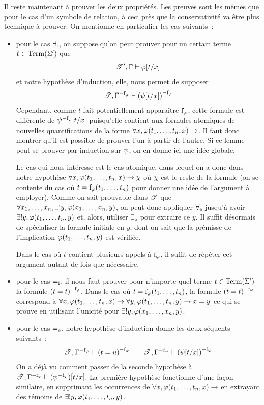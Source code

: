 Il reste maintenant à prouver les deux propriétés. Les preuves sont les mêmes
que pour le cas d'un symbole de relation, à ceci près que la conservativité va
être plus technique à prouver. On mentionne en particulier les cas suivants~:
\begin{itemize}
\item pour le cas $\mathord{\exists}_{\mathrm{i}}$, on suppose qu'on peut prouver pour un certain
  terme $t \in \operatorname{Term}(\Sigma')$ que
  \[\mathscr T',\Gamma \vdash \varphi[t/x]\]
  et notre hypothèse d'induction, elle, nous permet de supposer
  \[\mathscr T, {\Gamma}^{-\mathrm{f}_{\varphi}} \vdash {(\psi[t/x])}^{-\mathrm{f}_{\varphi}}\]
  Cependant, comme $t$ fait potentiellement apparaître $\mathrm{f}_{\varphi}$, cette formule
  est différente de ${\psi}^{-\mathrm{f}_{\varphi}}[t/x]$ puisqu'elle contient aux formules atomiques
  de nouvelles quantifications de la forme
  $\forall x, \varphi(t_1,\ldots,t_n,x) \to$.
  Il faut donc montrer qu'il est possible de prouver l'un à partir de l'autre.
  Si ce lemme peut se prouver par induction sur $\psi$, on en donne ici une
  idée globale.

  Le cas qui nous intéresse est le cas atomique, dans lequel on a donc dans
  notre hypothèse $\forall x, \varphi(t_1,\ldots,t_n,x) \to \chi$ où $\chi$
  est le reste de la formule (on se contente du cas où
  $t = \mathrm{f}_{\varphi}(t_1,\ldots,t_n)$ pour donner une
  idée de l'argument à employer). Comme on sait prouvable dans $\mathscr T$ que
  $\forall x_1,\ldots,x_n, \exists! y, \varphi(x_1,\ldots,x_n,y)$, on peut donc
  appliquer $\mathord{\forall}_{\mathrm{e}}$ jusqu'à avoir $\exists! y, \varphi(t_1,\ldots,t_n,y)$
  et, alors, utiliser $\mathord{\exists}_{\mathrm{e}}$ pour extraire ce $y$. Il suffit
  désormais de spécialiser la formule initiale en $y$, dont on sait que la
  prémisse de l'implication $\varphi(t_1,\ldots,t_n,y)$ est vérifiée.

  Dans le cas où $t$ contient plusieurs appels à $\mathrm{f}_{\varphi}$, il suffit de répéter
  cet argument autant de fois que nécessaire.

\item pour le cas $\mathord{=}_{\mathrm{i}}$, il nous faut prouver pour n'importe quel terme
  $t\in\operatorname{Term}(\Sigma')$ la formule ${(t = t)}^{-\mathrm{f}_{\varphi}}$. Dans le cas où
  $t = \mathrm{f}_{\varphi}(t_1,\ldots,t_n)$, la formule ${(t = t)}^{-\mathrm{f}_{\varphi}}$ correspond à
  $\forall x,\varphi(t_1,\ldots,t_n,x)\to
  \forall y,\varphi(t_1,\ldots,t_n,y)\to x = y$
  ce qui se prouve en utilisant l'unicité pour
  $\exists! y, \varphi(x_1,\ldots,x_n,y)$.

\item pour le cas $\mathord{=}_{\mathrm{e}}$, notre hypothèse d'induction donne les deux séquents
  suivants~:
  \[\mathscr T, {\Gamma}^{-\mathrm{f}_{\varphi}}\vdash {(t=u)}^{-\mathrm{f}_{\varphi}} \qquad
  \mathscr T, {\Gamma}^{-\mathrm{f}_{\varphi}}\vdash {(\psi[t/x])}^{-\mathrm{f}_{\varphi}}\]
  On a déjà vu comment passer de la seconde hypothèse à
  $\mathscr T, {\Gamma}^{-\mathrm{f}_{\varphi}}\vdash ({\psi}^{-\mathrm{f}_{\varphi}})[t/x]$. La première hypothèse
  fonctionne d'une façon similaire, en supprimant les occurrences de
  $\forall x, \varphi(t_1,\ldots,t_n,x) \to$ en extrayant des témoins de
  $\exists!y, \varphi(t_1,\ldots,t_n,y)$.
\end{itemize}

